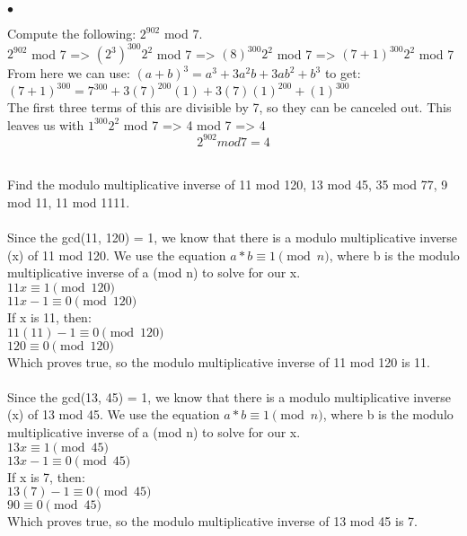 \documentclass{article}
\newenvironment{myitem}{\begin{list}{$\bullet$}
{\setlength{\itemsep}{-0pt}
\setlength{\topsep}{0pt}
\setlength{\labelwidth}{0pt}
\setlength{\leftmargin}{10pt}
\setlength{\parsep}{-0pt}
\setlength{\itemsep}{0pt}
\setlength{\partopsep}{0pt}}}%
{\end{list}}
\begin{document}
\begin{myitem}
\item Compute the following: $2^{902}$ mod 7.\\

$2^{902}$ mod 7 => $(2^{3})^{300}2^{2}$ mod 7 => $(8)^{300}2^{2}$ mod 7
=> $(7+1)^{300}2^{2}$ mod 7\\
From here we can use:  $(a+b)^{3} = a^{3} + 3a^{2}b + 3ab^{2} + b^{3}$ to get:\\
$(7+1)^{300} = 7^{300} + 3(7)^{200}(1) + 3(7)(1)^{200} + (1)^{300}$\\
The first three terms of this are divisible by 7, so they can be canceled out.
This leaves us with $1^{300}2^{2}$ mod 7 => 4 mod 7 => 4\\
$$2^{902} mod 7 = 4$$\\

\item Find the modulo multiplicative inverse of 11 mod 120, 13 mod 45,
  35 mod 77, 9 mod 11, 11 mod 1111.\\

\\
Since the gcd(11, 120) = 1, we know that there is a modulo multiplicative inverse
(x) of 11 mod 120. We use the equation $a*b \equiv 1 \pmod{n}$, where b is the
modulo multiplicative inverse of a (mod n) to solve for our x.\\
$11x \equiv 1 \pmod{120}$\\
$11x - 1  \equiv 0 \pmod{120}$\\
If x is 11, then:\\
$11(11)-1 \equiv 0 \pmod{120}$\\
$120 \equiv 0 \pmod{120}$\\
Which proves true, so the modulo multiplicative inverse of 11 mod 120 is 11.\\

 \\
Since the gcd(13, 45) = 1, we know that there is a modulo multiplicative inverse
(x) of 13 mod 45. We use the equation $a*b \equiv 1 \pmod{n}$, where b is the
modulo multiplicative inverse of a (mod n) to solve for our x.\\
$13x \equiv 1 \pmod{45}$\\
$13x - 1  \equiv 0 \pmod{45}$\\
If x is 7, then:\\
$13(7)-1 \equiv 0 \pmod{45}$\\
$90 \equiv 0 \pmod{45}$\\
Which proves true, so the modulo multiplicative inverse of 13 mod 45 is 7.\\


\end{myitem}
\end{document}
